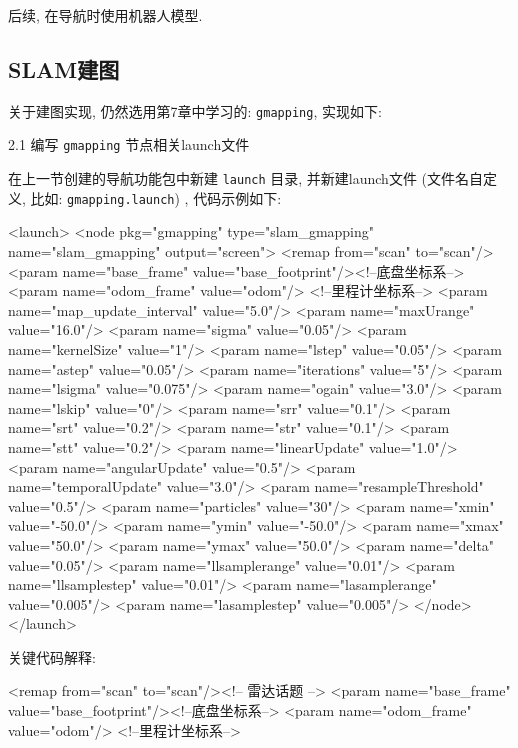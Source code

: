\documentclass[openany, fontset=windowsold]{ctexbook}
\theoremstyle{kaiti}
\theoremstyle{normal}
\begin{document}
后续, 在导航时使用机器人模型.

\subsection{SLAM建图}

关于建图实现, 仍然选用第7章中学习的: \verb|gmapping|, 实现如下: 

2.1 编写 \verb|gmapping| 节点相关launch文件

在上一节创建的导航功能包中新建 \verb|launch| 目录, 并新建launch文件 (文件名自定义, 比如: \verb|gmapping.launch|) , 代码示例如下:

\begin{xml}
  <launch>
      <node pkg="gmapping" type="slam_gmapping" name="slam_gmapping" output="screen">
        <remap from="scan" to="scan"/>
        <param name="base_frame" value="base_footprint"/><!--底盘坐标系-->
        <param name="odom_frame" value="odom"/> <!--里程计坐标系-->
        <param name="map_update_interval" value="5.0"/>
        <param name="maxUrange" value="16.0"/>
        <param name="sigma" value="0.05"/>
        <param name="kernelSize" value="1"/>
        <param name="lstep" value="0.05"/>
        <param name="astep" value="0.05"/>
        <param name="iterations" value="5"/>
        <param name="lsigma" value="0.075"/>
        <param name="ogain" value="3.0"/>
        <param name="lskip" value="0"/>
        <param name="srr" value="0.1"/>
        <param name="srt" value="0.2"/>
        <param name="str" value="0.1"/>
        <param name="stt" value="0.2"/>
        <param name="linearUpdate" value="1.0"/>
        <param name="angularUpdate" value="0.5"/>
        <param name="temporalUpdate" value="3.0"/>
        <param name="resampleThreshold" value="0.5"/>
        <param name="particles" value="30"/>
        <param name="xmin" value="-50.0"/>
        <param name="ymin" value="-50.0"/>
        <param name="xmax" value="50.0"/>
        <param name="ymax" value="50.0"/>
        <param name="delta" value="0.05"/>
        <param name="llsamplerange" value="0.01"/>
        <param name="llsamplestep" value="0.01"/>
        <param name="lasamplerange" value="0.005"/>
        <param name="lasamplestep" value="0.005"/>
      </node>
  </launch>
\end{xml}

关键代码解释: 

\begin{xml}
  <remap from="scan" to="scan"/><!-- 雷达话题 -->
  <param name="base_frame" value="base_footprint"/><!--底盘坐标系-->
  <param name="odom_frame" value="odom"/> <!--里程计坐标系-->
\end{xml}
\end{document}
